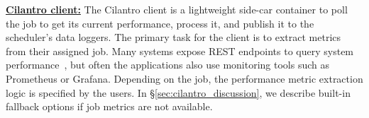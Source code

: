 \label{sec:design:cilantroclient}

\textbf{\underline{Cilantro client:}}
The Cilantro client is a lightweight side-car container  to poll the job to get its current performance,
process it, and 
publish it to the scheduler's data loggers.
% 
The primary task for the client is to extract metrics from their assigned job. Many
systems expose REST endpoints to query system performance~\cite{kuberneteshealth,
raydashboard}, but often the applications also use monitoring tools such as
Prometheus or Grafana.
Depending on the job, the performance metric extraction logic is specified by the users.
In \S\ref{sec:cilantro_discussion}, we describe built-in fallback options if job metrics are not
available.



